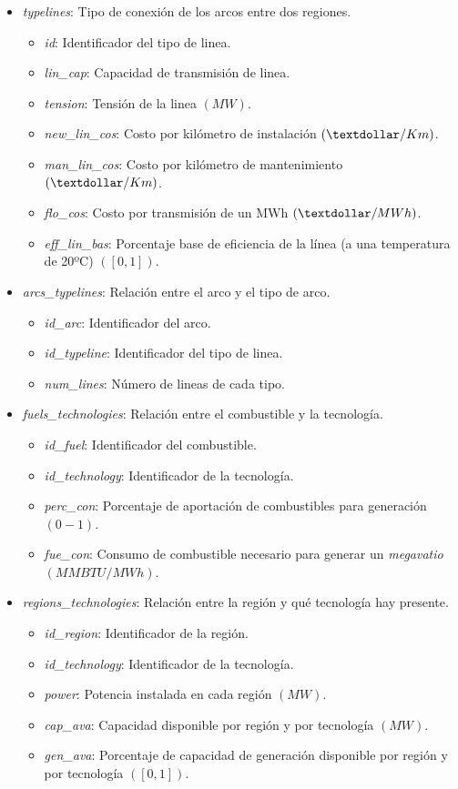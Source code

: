 \begin{itemize}
	\item \textit{typelines}: Tipo de conexión de los arcos entre dos regiones.
	\begin{itemize}
		\item \textit{id}: Identificador del tipo de linea.		
		\item \textit{lin\_cap}: Capacidad de transmisión de linea.
		\item \textit{tension}: Tensión de la linea $ (MW) $.
		\item \textit{new\_lin\_cos}: Costo por kilómetro de instalación $ (\textdollar/Km) $.
		\item \textit{man\_lin\_cos}: Costo por kilómetro de mantenimiento $ (\textdollar/Km) $.
		\item \textit{flo\_cos}: Costo por transmisión de un MWh $ (\textdollar/MWh) $.
		\item \textit{eff\_lin\_bas}: Porcentaje base de eficiencia de la línea (a una temperatura de 20ºC) $ ([0,1]) $.
	\end{itemize}

	\item \textit{arcs\_typelines}: Relación entre el arco y el tipo de arco.
	\begin{itemize}
		\item \textit{id\_arc}: Identificador del arco.
		\item \textit{id\_typeline}: Identificador del tipo de linea.
		\item \textit{num\_lines}: Número de lineas de cada tipo.
	\end{itemize}
	
	\item \textit{fuels\_technologies}: Relación entre el combustible y la tecnología.
	\begin{itemize}
		\item \textit{id\_fuel}: Identificador del combustible.
		\item \textit{id\_technology}: Identificador de la tecnología.
		\item \textit{perc\_con}: Porcentaje de aportación de combustibles para generación $ (0 - 1) $.
		\item \textit{fue\_con}: Consumo de combustible necesario para generar un \textit{megavatio} $ (MMBTU/MWh) $.
	\end{itemize}

	\item \textit{regions\_technologies}: Relación entre la región y qué tecnología hay presente.
	\begin{itemize}
		\item \textit{id\_region}: Identificador de la región.
		\item \textit{id\_technology}: Identificador de la tecnología.
		\item \textit{power}: Potencia instalada en cada región $ (MW) $.
		\item \textit{cap\_ava}: Capacidad disponible por región y por tecnología $ (MW) $.
		\item \textit{gen\_ava}: Porcentaje de capacidad de generación disponible por región y por tecnología $ ([0,1]) $.
	\end{itemize}
	

\end{itemize}
